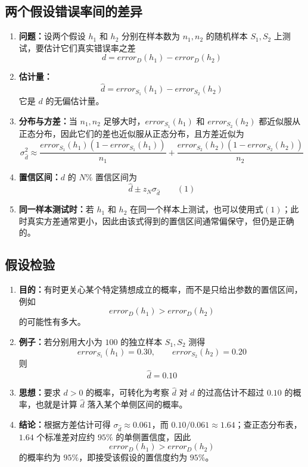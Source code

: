 \documentclass[../main.tex]{subfiles}
\begin{document}
\subsection{两个假设错误率间的差异}
\begin{enumerate}
    \item \textbf{问题：}设两个假设 $h_1$ 和 $h_2$ 分别在样本数为 $n_1,n_2$ 的随机样本 $S_1,S_2$ 上测试，要估计它们真实错误率之差
    $$
    d=error_D(h_1)-error_D(h_2)
    $$
    \item \textbf{估计量：}
    $$
    \widehat{d}=error_{S_1}(h_1)-error_{S_2}(h_2)
    $$
    它是 $d$ 的无偏估计量。
    \item \textbf{分布与方差：}当 $n_1,n_2$ 足够大时，$error_{S_1}(h_1)$ 和 $error_{S_2}(h_2)$ 都近似服从正态分布，因此它们的差也近似服从正态分布，且方差近似为
    $$
    \sigma_{\widehat{d}}^2 \approx
    \frac{error_{S_1}(h_1)\left(1-error_{S_1}(h_1)\right)}{n_1}
    +
    \frac{error_{S_2}(h_2)\left(1-error_{S_2}(h_2)\right)}{n_2}
    $$
    \item \textbf{置信区间：}$d$ 的 $N\%$ 置信区间为
    $$
    \widehat{d}\pm z_N \sigma_{\widehat{d}}
    \qquad (1)
    $$
    \item \textbf{同一样本测试时：}若 $h_1$ 和 $h_2$ 在同一个样本上测试，也可以使用式$(1)$；此时真实方差通常更小，因此由该式得到的置信区间通常偏保守，但仍是正确的。
\end{enumerate}

\subsection{假设检验}
\begin{enumerate}
    \item \textbf{目的：}有时更关心某个特定猜想成立的概率，而不是只给出参数的置信区间，例如
    $$
    error_D(h_1)>error_D(h_2)
    $$
    的可能性有多大。
    \item \textbf{例子：}若分别用大小为 $100$ 的独立样本 $S_1,S_2$ 测得
    $$
    error_{S_1}(h_1)=0.30,\qquad error_{S_2}(h_2)=0.20
    $$
    则
    $$
    \widehat{d}=0.10
    $$
    \item \textbf{思想：}要求 $d>0$ 的概率，可转化为考察 $\widehat{d}$ 对 $d$ 的过高估计不超过 $0.10$ 的概率，也就是计算 $\widehat{d}$ 落入某个单侧区间的概率。
    \item \textbf{结论：}根据方差估计可得 $\sigma_{\widehat{d}}\approx 0.061$，而 $0.10/0.061\approx 1.64$；查正态分布表，$1.64$ 个标准差对应约 $95\%$ 的单侧置信度，因此
    $$
    error_D(h_1)>error_D(h_2)
    $$
    的概率约为 $95\%$，即接受该假设的置信度约为 $95\%$。
\end{enumerate}
\end{document}
